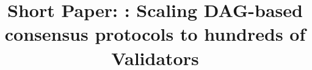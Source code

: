 \documentclass[runningheads]{llncs}
\newif\ifpublish
\begin{document}
\title{Short Paper: \sysname: Scaling DAG-based consensus protocols to hundreds of Validators}
\titlerunning{\sysname}

\ifpublish
    \author{
        First Author\inst{1}\orcidID{0000-1111-2222-3333} \and
        Second Author\inst{2,3}\orcidID{1111-2222-3333-4444} \and
        Third Author\inst{3}\orcidID{2222--3333-4444-5555}
    }
    \authorrunning{F. Author et al.}
    \institute{
        Princeton University, Princeton NJ 08544, USA \and
        Springer Heidelberg, Tiergartenstr. 17, 69121 Heidelberg, Germany \and
        ABC Institute, Rupert-Karls-University Heidelberg, Heidelberg, Germany
    }
\else
    \author{}
    \institute{}
\fi

\maketitle

\begin{abstract}
    
    \ifpublish
        \keywords{Blockchain \and BFT Consensus \and Dynamic Participation}
    \fi
\end{abstract}





% 

\ifpublish
    \begin{credits}
        \subsubsection{\ackname}
        This work is supported by Mysten Labs.
    \end{credits}
\fi



\end{document}
